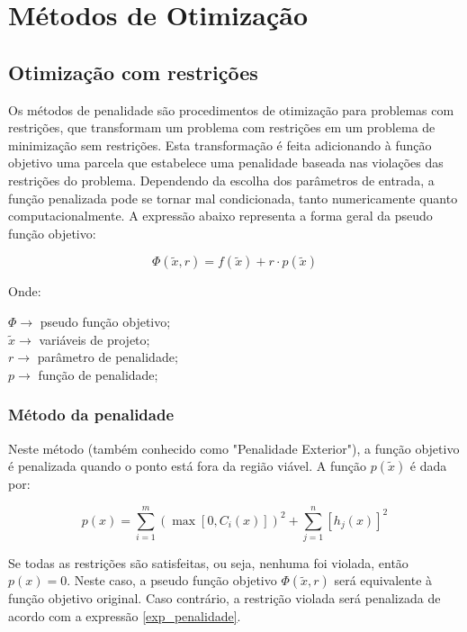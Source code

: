 \documentclass[a4paper, 12pt]{article}
\begin{document}
\section{Métodos de Otimização}

\subsection{Otimização com restrições}
Os métodos de penalidade são procedimentos de otimização para problemas com restrições, que transformam um problema com restrições em um problema de minimização sem restrições. Esta transformação é feita adicionando à função objetivo uma parcela que estabelece uma penalidade baseada nas violações das restrições do problema. Dependendo da escolha dos parâmetros de entrada, a função penalizada pode se tornar mal condicionada, tanto numericamente quanto computacionalmente. A expressão abaixo representa a forma geral da pseudo função objetivo:

\begin{equation}
    \Phi(\tilde{x}, r) = f(\tilde{x}) + r \cdot p(\tilde{x})
\end{equation}

Onde: 

$\Phi \rightarrow$ pseudo função objetivo; \\

$\tilde{x} \rightarrow$ variáveis de projeto; \\

$r \rightarrow$ parâmetro de penalidade; \\ 

$p \rightarrow$ função de penalidade; \\ 

\subsubsection{Método da penalidade}

Neste método (também conhecido como "Penalidade Exterior"), a função objetivo é penalizada quando o ponto está fora da região viável. A função $p(\tilde{x})$ é dada por:

\begin{equation}\label{exp_penalidade}
    p(x) = \sum\limits_{i=1}^{m} \left( \max [ 0 , C_i(x)] \right)^2 + \sum\limits_{j=1}^{n} \left[ h_j(x) \right]^2
\end{equation}

Se todas as restrições são satisfeitas, ou seja, nenhuma foi violada, então $p(x) = 0$. Neste caso, a pseudo função objetivo $\Phi(\tilde{x}, r)$ será equivalente à função objetivo original. Caso contrário, a restrição violada será penalizada de acordo com a expressão \eqref{exp_penalidade}. 
\end{document}

